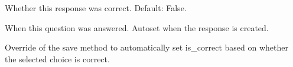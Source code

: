 \documentclass[letterpaper,10pt,english]{sphinxmanual}
\begin{document}
\begin{fulllineitems}
\begin{fulllineitems}
\label{\detokenize{models:QuizResponse.is_correct}}
\pysigstartsignatures
{}
\pysigstopsignatures
\sphinxAtStartPar
Whether this response was correct.
Default: False.

\end{fulllineitems}


\begin{fulllineitems}
\label{\detokenize{models:QuizResponse.response_time}}
\pysigstartsignatures
{}
\pysigstopsignatures
\sphinxAtStartPar
When this question was answered.
Auto\sphinxhyphen{}set when the response is created.

\end{fulllineitems}


\begin{fulllineitems}
\label{\detokenize{models:QuizResponse.save}}
\pysigstartsignatures
{}
\pysigstopsignatures
\sphinxAtStartPar
Override of the save method to automatically set is\_correct
based on whether the selected choice is correct.

\end{fulllineitems}


\end{fulllineitems}
\end{document}
